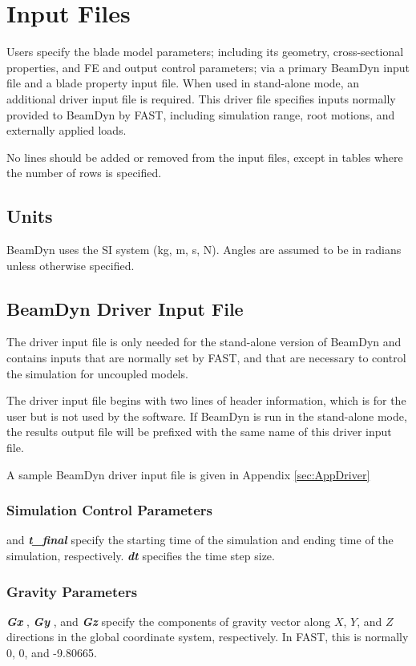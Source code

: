 \chapter{Input Files}
\label{sec:InputFiles}
Users specify the blade model parameters; including its geometry, cross-sectional properties, and FE and output control parameters; via a primary BeamDyn input file and a blade property input file. 
When used in stand-alone mode, an additional driver input file is required. 
This driver file specifies inputs normally provided to BeamDyn by FAST, including simulation range, root motions, and externally applied loads.

No lines should be added or removed from the input files, except in tables where the number of rows is specified.

\section{Units}
BeamDyn uses the SI system (kg, m, s, N). 
Angles are assumed to be in radians unless otherwise specified.

\section{BeamDyn Driver Input File}
\label{sec:DriverInputFile}
The driver input file is only needed for the stand-alone version of BeamDyn and contains inputs that are normally set by FAST, and that are necessary to control the simulation for uncoupled models. 

The driver input file begins with two lines of header information, which is for the user but is not used by the software. 
If BeamDyn is run in the stand-alone mode, the results output file will be prefixed with the same name of this driver input file.

A sample BeamDyn driver input file is given in Appendix \ref{sec:AppDriver}

\subsection{Simulation Control Parameters}
  and \textbf{\textit{t\_final} } specify the starting time of the simulation and ending time of the simulation, respectively. 
\textbf{\textit{dt} } specifies the time step size.

\subsection{Gravity Parameters}
\textbf{\textit{Gx} }, \textbf{\textit{Gy} }, and \textbf{\textit{Gz} } specify the components of gravity vector along $X$, $Y$, and $Z$ directions in the global coordinate system, respectively.  
In FAST, this is normally 0, 0, and -9.80665.

